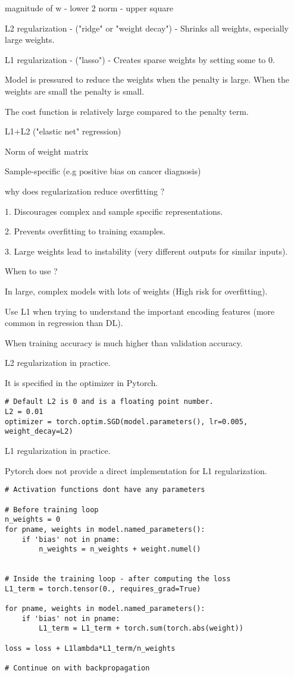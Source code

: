 \documentclass[30pt, a4]{article}
\begin{document}
magnitude of w - lower 2 norm - upper square

L2 regularization - ("ridge" or "weight decay") - Shrinks all weights,
especially large weights.

L1 regularization - ("lasso") - Creates sparse weights by setting some to 0.

Model is pressured to reduce the weights when the penalty is large. When the
weights are small the penalty is small.

The cost function is relatively large compared to the penalty term.

L1+L2 ("elastic net" regression)

Norm of weight matrix

Sample-specific (e.g positive bias on cancer diagnosis)

why does regularization reduce overfitting ?

1. Discourages complex and sample specific representations.

2. Prevents overfitting to training examples.

3. Large weights lead to instability (very different outputs for similar
inputs).

When to use ?

In large, complex models with lots of weights (High risk for overfitting).

Use L1 when trying to understand the important encoding features (more common in
regression than DL).

When training accuracy is much higher than validation accuracy.

L2 regularization in practice.

It is specified in the optimizer in Pytorch.

\begin{lstlisting}
# Default L2 is 0 and is a floating point number.
L2 = 0.01
optimizer = torch.optim.SGD(model.parameters(), lr=0.005, weight_decay=L2)
\end{lstlisting}

L1 regularization in practice.

Pytorch does not provide a direct implementation for L1 regularization.

\begin{lstlisting}
# Activation functions dont have any parameters

# Before training loop
n_weights = 0
for pname, weights in model.named_parameters():
    if 'bias' not in pname:
        n_weights = n_weights + weight.numel()


# Inside the training loop - after computing the loss
L1_term = torch.tensor(0., requires_grad=True)

for pname, weights in model.named_parameters():
    if 'bias' not in pname:
        L1_term = L1_term + torch.sum(torch.abs(weight))

loss = loss + L1lambda*L1_term/n_weights

# Continue on with backpropagation
\end{lstlisting}
\end{document}
